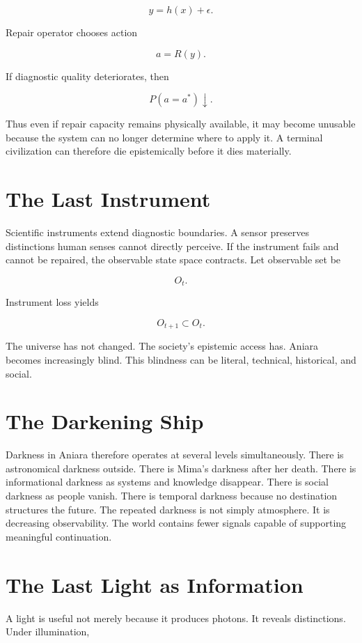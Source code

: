 \documentclass[11pt,oneside]{book}
\theoremstyle{definition}
\theoremstyle{remark}
\begin{document}
\[
y=h(x)+\epsilon.
\]

Repair operator chooses action

\[
a=R(y).
\]

If diagnostic quality deteriorates, then

\[
P(a=a^\ast)\downarrow.
\]

Thus even if repair capacity remains physically available, it may become unusable because the system
can no longer determine where to apply it. A terminal civilization can therefore die epistemically
before it dies materially.

\section{The Last Instrument}

Scientific instruments extend diagnostic boundaries. A sensor preserves distinctions human senses
cannot directly perceive. If the instrument fails and cannot be repaired, the observable state space
contracts. Let observable set be

\[
O_t.
\]

Instrument loss yields

\[
O_{t+1}\subset O_t.
\]

The universe has not changed. The society's epistemic access has. Aniara becomes increasingly blind.
This blindness can be literal, technical, historical, and social.

\section{The Darkening Ship}

Darkness in Aniara therefore operates at several levels simultaneously. There is astronomical
darkness outside. There is Mima's darkness after her death. There is informational darkness as
systems and knowledge disappear. There is social darkness as people vanish. There is temporal
darkness because no destination structures the future. The repeated darkness is not simply
atmosphere. It is decreasing observability. The world contains fewer signals capable of supporting
meaningful continuation.

\section{The Last Light as Information}

A light is useful not merely because it produces photons. It reveals distinctions. Under
illumination,
\end{document}
